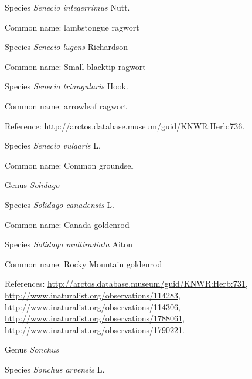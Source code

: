 \documentclass[9pt, article]{memoir}
\begin{document}
\begin{multicols}{2}
\vspace{6pt}\noindent\hspace{36pt}Species \textit{Senecio integerrimus} Nutt.


Common name: lambstongue ragwort

\vspace{6pt}\noindent\hspace{36pt}Species \textit{Senecio lugens} Richardson


Common name: Small blacktip ragwort

\vspace{6pt}\noindent\hspace{36pt}Species \textit{Senecio triangularis} Hook.


Common name: arrowleaf ragwort

Reference: 
\url{http://arctos.database.museum/guid/KNWR:Herb:736}.

\vspace{6pt}\noindent\hspace{36pt}Species \textit{Senecio vulgaris} L.


Common name: Common groundsel

\vspace{6pt}\noindent\hspace{30pt}Genus \textit{Solidago}


\vspace{6pt}\noindent\hspace{36pt}Species \textit{Solidago canadensis} L.


Common name: Canada goldenrod

\vspace{6pt}\noindent\hspace{36pt}Species \textit{Solidago multiradiata} Aiton


Common name: Rocky Mountain goldenrod

References: 
\url{http://arctos.database.museum/guid/KNWR:Herb:731}, 
\url{http://www.inaturalist.org/observations/114283}, 
\url{http://www.inaturalist.org/observations/114306}, 
\url{http://www.inaturalist.org/observations/1788061}, 
\url{http://www.inaturalist.org/observations/1790221}.

\vspace{6pt}\noindent\hspace{30pt}Genus \textit{Sonchus}


\vspace{6pt}\noindent\hspace{36pt}Species \textit{Sonchus arvensis} L.



\end{multicols}
\end{document}
